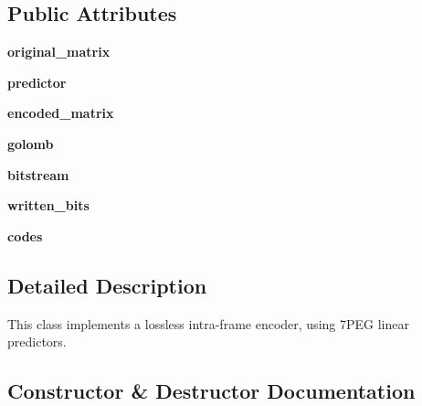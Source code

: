 \subsection*{Public Attributes}
\begin{DoxyCompactItemize}
\item 
\mbox{\label{classencoders_1_1IntraFrameEncoder_a4600a89970950d1a8d3e66822bc9a8dc}} 
{\bfseries original\+\_\+matrix}
\item 
\mbox{\label{classencoders_1_1IntraFrameEncoder_a7dad9586d3042a47fa70dc4ae266e4bf}} 
{\bfseries predictor}
\item 
\mbox{\label{classencoders_1_1IntraFrameEncoder_a80b4fdfe836ff78cefbcd80a79288a88}} 
{\bfseries encoded\+\_\+matrix}
\item 
\mbox{\label{classencoders_1_1IntraFrameEncoder_a91d92ad3c45e5843ed7083ef0e99b7f0}} 
{\bfseries golomb}
\item 
\mbox{\label{classencoders_1_1IntraFrameEncoder_a8aa0baad916a13b5c7175221d5d6d36d}} 
{\bfseries bitstream}
\item 
\mbox{\label{classencoders_1_1IntraFrameEncoder_afb271899d84235a96de29f6bb3705d1e}} 
{\bfseries written\+\_\+bits}
\item 
\mbox{\label{classencoders_1_1IntraFrameEncoder_a49a1355dbe30f6433ffcb15125ade826}} 
{\bfseries codes}
\end{DoxyCompactItemize}


\subsection{Detailed Description}
\begin{DoxyVerb}This class implements a lossless intra-frame encoder, using 7PEG linear predictors.
\end{DoxyVerb}
 

\subsection{Constructor \& Destructor Documentation}
\mbox{\label{classencoders_1_1IntraFrameEncoder_abdd616416c053aad5a2879ac2c64b7c6}} 
